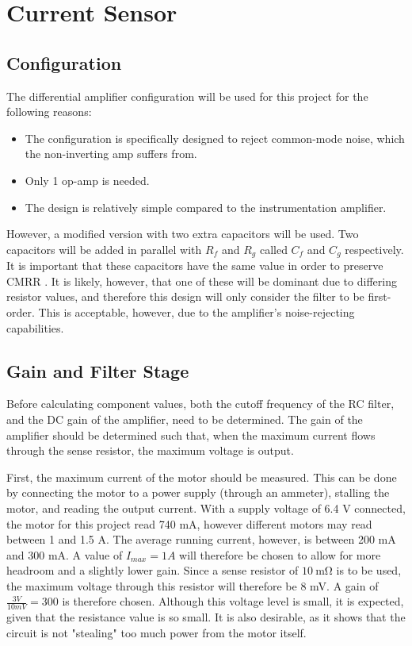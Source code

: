 \graphicspath{{content/2_design/figures/}}
\section{Current Sensor}
\subsection{Configuration}

The differential amplifier configuration will be used for this project for the following reasons:
\begin{itemize}
  \item The configuration is specifically designed to reject common-mode noise, which the non-inverting amp suffers from.
  \item Only 1 op-amp is needed.
  \item The design is relatively simple compared to the instrumentation amplifier.
\end{itemize}

However, a modified version with two extra capacitors will be used. Two capacitors will be added in parallel with $R_f$ and $R_g$ called $C_f$ and $C_g$ respectively. It is important that these capacitors have the same
value in order to preserve CMRR \cite{opAmpConfigurations}. It is likely, however, that one of these will be dominant due to differing resistor values, and therefore this design will only consider the filter to be first-order.
This is acceptable, however, due to the amplifier's noise-rejecting capabilities.

\subsection{Gain and Filter Stage}
Before calculating component values, both the cutoff frequency of the RC filter, and the DC gain of the amplifier, need to be determined. The gain of the amplifier should be determined
such that, when the maximum current flows through the sense resistor, the maximum voltage is output.

First, the maximum current of the motor should be measured. This can be done by connecting the motor to a power supply (through an ammeter), stalling the motor, and reading the output current.
With a supply voltage of 6.4 V connected, the motor for this project read 740 mA, however different motors may read between 1 and 1.5 A. The average running current, however, is between 200 mA
and 300 mA. A value of $I_{max} = 1 A$ will therefore be chosen to allow for more headroom and a slightly lower gain.
Since a sense resistor of $\SI{10}{\milli\ohm}$ is to be used, the maximum voltage through this resistor will therefore be 8 mV. A gain of $\frac{3 V}{10 mV} = 300$ is therefore chosen.
Although this voltage level is small, it is expected, given that the resistance value is so small. It is also desirable, as it shows that the circuit is not "stealing" too much power from the motor itself.

